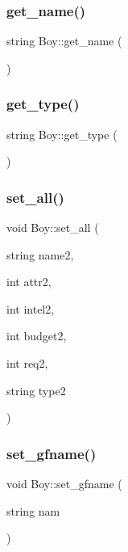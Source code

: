 \mbox{\label{classBoy_a38e4b40846c88387e33eabdb7cfda958}} 
\subsubsection{\texorpdfstring{get\+\_\+name()}{get\_name()}}
{\footnotesize\ttfamily string Boy\+::get\+\_\+name (\begin{DoxyParamCaption}{ }\end{DoxyParamCaption})}

\mbox{\label{classBoy_ac3bb7d0ef3638d92e64d71809a84ebaa}} 
\subsubsection{\texorpdfstring{get\+\_\+type()}{get\_type()}}
{\footnotesize\ttfamily string Boy\+::get\+\_\+type (\begin{DoxyParamCaption}{ }\end{DoxyParamCaption})}

\mbox{\label{classBoy_a4a2303961bc7e23c2e19a4781277d088}} 
\subsubsection{\texorpdfstring{set\+\_\+all()}{set\_all()}}
{\footnotesize\ttfamily void Boy\+::set\+\_\+all (\begin{DoxyParamCaption}\item[{string}]{name2,  }\item[{int}]{attr2,  }\item[{int}]{intel2,  }\item[{int}]{budget2,  }\item[{int}]{req2,  }\item[{string}]{type2 }\end{DoxyParamCaption})}

\mbox{\label{classBoy_ac9140aff9675e4e4a2cd2980d65ab0ca}} 
\subsubsection{\texorpdfstring{set\+\_\+gfname()}{set\_gfname()}}
{\footnotesize\ttfamily void Boy\+::set\+\_\+gfname (\begin{DoxyParamCaption}\item[{string}]{nam }\end{DoxyParamCaption})}

